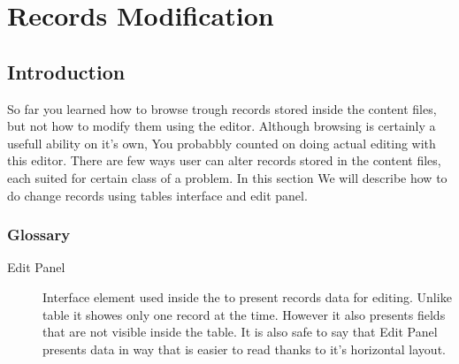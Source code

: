 \section{Records Modification}

\subsection{Introduction}
So far you learned how to browse trough records stored inside the content files, but not how to modify them using the \OCS{} editor. Although browsing is certainly a usefull ability on it's own, You probabbly counted on doing actual editing with this editor. There are few ways user can alter records stored in the content files, each suited for certain class of a problem. In this section We will describe how to do change records using tables interface and edit panel.

\subsubsection{Glossary}
\begin{description}
  \item[Edit Panel] Interface element used inside the \OCS{} to present records data for editing. Unlike table it showes only one record at the time. However it also presents fields that are not visible inside the table. It is also safe to say that Edit Panel presents data in way that is easier to read thanks to it's horizontal layout.
\end{description}

